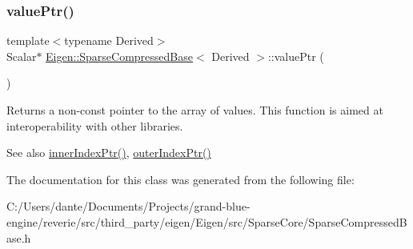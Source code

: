 \subsubsection{\texorpdfstring{valuePtr()}{valuePtr()}\hspace{0.1cm}{\footnotesize\ttfamily [2/2]}}
{\footnotesize\ttfamily template$<$typename Derived$>$ \\
Scalar$\ast$ \mbox{\hyperlink{class_eigen_1_1_sparse_compressed_base}{Eigen\+::\+Sparse\+Compressed\+Base}}$<$ Derived $>$\+::value\+Ptr (\begin{DoxyParamCaption}{ }\end{DoxyParamCaption})\hspace{0.3cm}{\ttfamily [inline]}}

\begin{DoxyReturn}{Returns}
a non-\/const pointer to the array of values. This function is aimed at interoperability with other libraries. 
\end{DoxyReturn}
\begin{DoxySeeAlso}{See also}
\mbox{\hyperlink{class_eigen_1_1_sparse_compressed_base_a197111c1289644f1ea38fe683ccdd82a}{inner\+Index\+Ptr()}}, \mbox{\hyperlink{class_eigen_1_1_sparse_compressed_base_a53a82f962686e18c8dc07a4b9a85ed7b}{outer\+Index\+Ptr()}} 
\end{DoxySeeAlso}


The documentation for this class was generated from the following file\+:\begin{DoxyCompactItemize}
\item 
C\+:/\+Users/dante/\+Documents/\+Projects/grand-\/blue-\/engine/reverie/src/third\+\_\+party/eigen/\+Eigen/src/\+Sparse\+Core/Sparse\+Compressed\+Base.\+h\end{DoxyCompactItemize}
